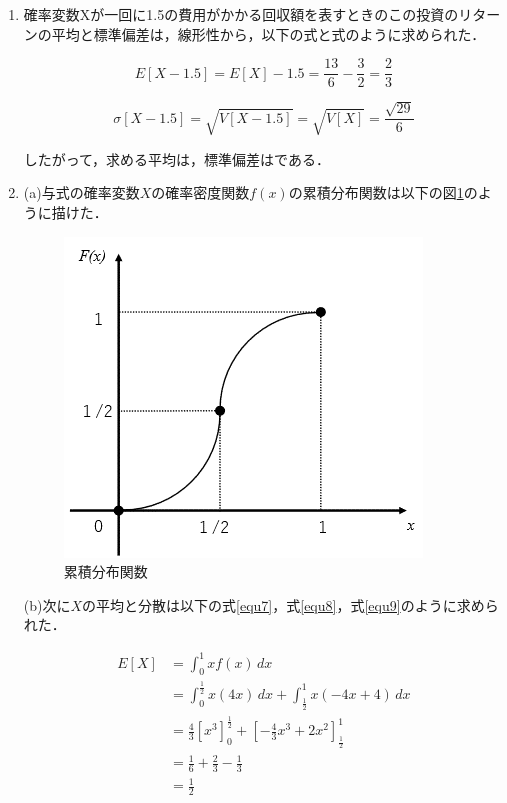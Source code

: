 \documentclass[a4paper,10pt]{jarticle}
\begin{document}
\begin{enumerate}
	 \item 確率変数Xが一回に1.5の費用がかかる回収額を表すときのこの投資のリターンの平均と標準偏差は，線形性から，以下の式と式のように求められた．

	 \begin{equation}
		\label{equ5}
		E[X-1.5] = E[X] - 1.5 = \frac{13}{6} - \frac{3}{2} = \frac{2}{3}
	 \end{equation}
	 
	 \begin{equation}
		\label{equ6}
		\sigma[X-1.5] = \sqrt{V[X-1.5]} = \sqrt{V[X]} = \frac{\sqrt{29}}{6}
	 \end{equation}

	 したがって，求める平均は，標準偏差はである．

	 \vspace{6mm}

	 \item (a)与式の確率変数$X$の確率密度関数$f(x)$の累積分布関数は以下の図\ref*{apara2}のように描けた．
	 
	 \begin{figure}[ht]
		\begin{center}
		 \includegraphics[scale=1.0]{zu2.png}
		 \caption{累積分布関数}
		 \label{apara2}
		\end{center}
		\end{figure}

		(b)次に$X$の平均と分散は以下の式\ref*{equ7}，式\ref*{equ8}，式\ref*{equ9}のように求められた．

		\begin{equation}
			\label{equ7}
			\begin{split}
				E[X] &= \int_{0}^{1} xf(x) \,dx \\
						 &= \int_{0}^{\frac{1}{2}} x(4x) \,dx + \int_{\frac{1}{2}}^{1} x(-4x+4) \,dx \\
						 &= \frac{4}{3}[x^3]_{0}^{\frac{1}{2}}+ [-\frac{4}{3}x^3+2x^2]_{\frac{1}{2}}^{1} \\
						 &= \frac{1}{6}+\frac{2}{3}-\frac{1}{3} \\
						 &= \frac{1}{2}
			\end{split}
		\end{equation}


\end{enumerate}
\end{document}
